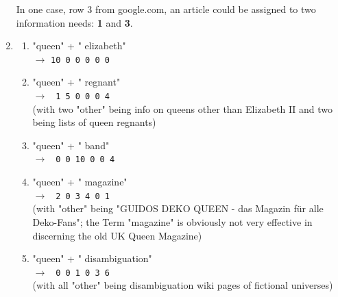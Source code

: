 \documentclass[10pt,a4paper]{article}
\begin{document}
\begin{enumerate}
        In one case, row 3 from google.com, an article could be assigned to two information needs: \textbf{1} and \textbf{3}.
    \item \begin{enumerate}
            \item "queen" + " elizabeth"\\
                $\rightarrow$ \texttt{10  0  0  0  0  0}
            \item "queen" + " regnant"\\
                $\rightarrow$ \texttt{ 1  5  0  0  0  4}
                \\(with two "other" being info on queens other than Elizabeth II and two being lists of queen regnants)
            \item "queen" + " band"\\
                $\rightarrow$ \texttt{ 0  0 10  0  0  4}
            \item "queen" + " magazine"\\
                $\rightarrow$ \texttt{ 2  0  3  4  0  1}\\
                (with "other" being "GUIDOS DEKO QUEEN - das Magazin für alle Deko-Fans"; the Term "magazine" is obviously not very effective in discerning the old UK Queen Magazine)
            \item "queen" + " disambiguation"\\
                $\rightarrow$ \texttt{ 0  0  1  0  3  6}\\
                (with all "other" being disambiguation wiki pages of fictional universes)
        \end{enumerate}
\end{enumerate}
\end{document}
